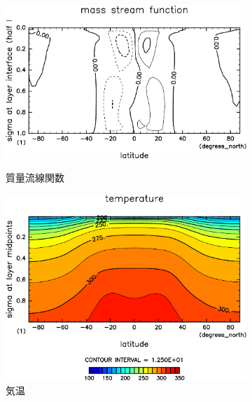\documentclass[body]{subfiles}
\begin{document}
\begin{figure}[t]
\begin{subfigure}{.4\textwidth}
		\centering
		\includegraphics[width=\textwidth]{S1500-nc/MSF,time=3650:4015-crop-rotate.pdf}
		\\\vspace{24pt}
		\caption{質量流線関数\hmu*{[kg/s]}}\label{S1500nc質量流線関数}
	\end{subfigure}
	\begin{subfigure}{.4\textwidth}
		\centering
		\includegraphics[width=\textwidth]{S1500-nc/Temp,time=3650:4015-crop-rotate.pdf}
		\caption{気温\hmu*{[K]}}\label{S1500nc気温分布}
	\end{subfigure}
	\begin{subfigure}{.4\textwidth}
		\centering

\end{subfigure}
\end{figure}
\end{document}
